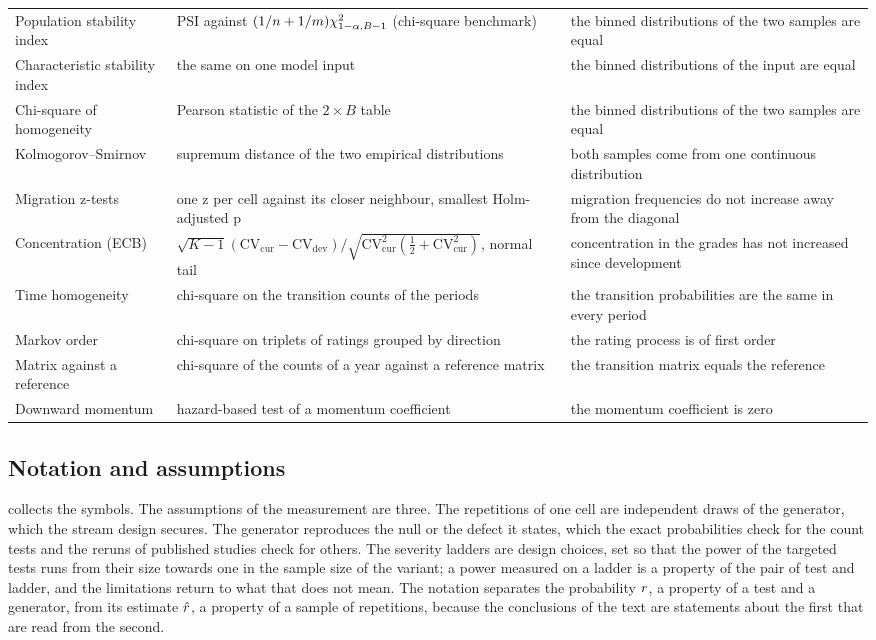 \begin{table}[htbp]
{\begin{tabular}{p{3.0cm}p{5.0cm}p{6.4cm}}
Population stability index & PSI against $(1/n+1/m)\chi^2_{1-\alpha,B-1}$ (chi-square benchmark) & the binned distributions of the two samples are equal \\
Characteristic stability index & the same on one model input & the binned distributions of the input are equal \\
Chi-square of homogeneity & Pearson statistic of the $2\times B$ table & the binned distributions of the two samples are equal \\
Kolmogorov--Smirnov & supremum distance of the two empirical distributions & both samples come from one continuous distribution \\
Migration z-tests & one z per cell against its closer neighbour, smallest Holm-adjusted p & migration frequencies do not increase away from the diagonal \\
Concentration (ECB) & $\sqrt{K-1}(\mathrm{CV}_\mathrm{cur}-\mathrm{CV}_\mathrm{dev})/\sqrt{\mathrm{CV}_\mathrm{cur}^2(\tfrac12+\mathrm{CV}_\mathrm{cur}^2)}$, normal tail & concentration in the grades has not increased since development \\
Time homogeneity & chi-square on the transition counts of the periods & the transition probabilities are the same in every period \\
Markov order & chi-square on triplets of ratings grouped by direction & the rating process is of first order \\
Matrix against a reference & chi-square of the counts of a year against a reference matrix & the transition matrix equals the reference \\
Downward momentum & hazard-based test of a momentum coefficient & the momentum coefficient is zero \\
\bottomrule
\end{tabular}}
\end{table}

\subsection{Notation and assumptions}
\label{sec:pf-notation}

 collects the symbols.
The assumptions of the measurement are three.
The repetitions of one cell are independent draws of the generator, which the stream design secures.
The generator reproduces the null or the defect it states, which the exact probabilities check for the count tests and the reruns of published studies check for others.
The severity ladders are design choices, set so that the power of the targeted tests runs from their size towards one in the sample size of the variant; a power measured on a ladder is a property of the pair of test and ladder, and the limitations return to what that does not mean. The notation separates the probability $r$, a property of a test and a generator, from its estimate $\hat{r}$, a property of a sample of repetitions, because the conclusions of the text are statements about the first that are read from the second.


